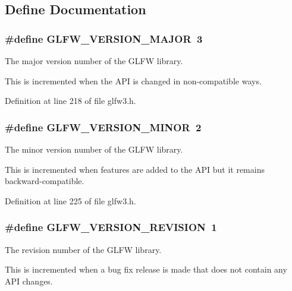 \subsection{Define Documentation}
\hypertarget{group__init_g6337d9ea43b22fc529b2bba066b4a576}{
\subsubsection[GLFW\_\-VERSION\_\-MAJOR]{\setlength{\rightskip}{0pt plus 5cm}\#define GLFW\_\-VERSION\_\-MAJOR~3}}
\label{group__init_g6337d9ea43b22fc529b2bba066b4a576}


The major version number of the GLFW library. 

This is incremented when the API is changed in non-compatible ways. 

Definition at line 218 of file glfw3.h.\hypertarget{group__init_gf80d40f0aea7088ff337606e9c48f7a3}{
\subsubsection[GLFW\_\-VERSION\_\-MINOR]{\setlength{\rightskip}{0pt plus 5cm}\#define GLFW\_\-VERSION\_\-MINOR~2}}
\label{group__init_gf80d40f0aea7088ff337606e9c48f7a3}


The minor version number of the GLFW library. 

This is incremented when features are added to the API but it remains backward-compatible. 

Definition at line 225 of file glfw3.h.\hypertarget{group__init_gb72ae2e2035d9ea461abc3495eac0502}{
\subsubsection[GLFW\_\-VERSION\_\-REVISION]{\setlength{\rightskip}{0pt plus 5cm}\#define GLFW\_\-VERSION\_\-REVISION~1}}
\label{group__init_gb72ae2e2035d9ea461abc3495eac0502}


The revision number of the GLFW library. 

This is incremented when a bug fix release is made that does not contain any API changes. 

